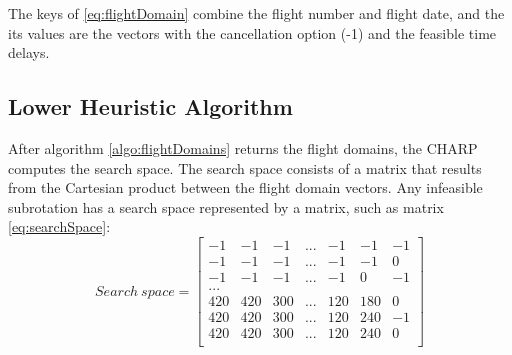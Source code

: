 The keys of  \ref{eq:flightDomain} combine the flight number and flight date, and the its values are the vectors with the cancellation option (-1) and the feasible time delays.
\subsection{Lower Heuristic Algorithm} \label{sec:lowerHeuristic}

After algorithm \ref{algo:flightDomains} returns the flight domains, the CHARP computes the search space. The search space consists of a matrix that results from the Cartesian product between the flight domain vectors. Any infeasible subrotation has a search space represented by a matrix, such as matrix \ref{eq:searchSpace}:\\


\begin{equation}
	Search \: space =	
	\begin{bmatrix}
		-1	&  -1	&  -1	& ...	&  -1 &	  -1 &	-1\\
		-1	&  -1	&  -1	& ...	&  -1 &	  -1 &	0\\
		-1	&  -1	&  -1	& ...	&  -1 &	   0 &	-1\\
		...	&		&		&       &     &      &    \\    	
		420	& 420	& 300	& ...	& 120 &	 180 &	0\\
		420	& 420	& 300	& ...	& 120 &	 240 &	-1\\
		420	& 420	& 300	& ...	& 120 &	 240 &	0\\
	\end{bmatrix}
	\label{eq:searchSpace}
\end{equation}

